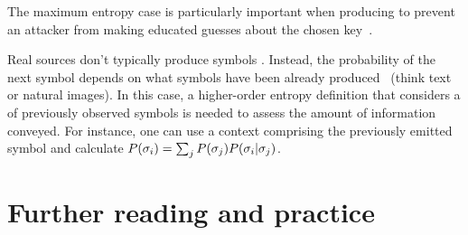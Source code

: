 %
The maximum entropy case is particularly important when producing 
to prevent an attacker from making educated guesses about the chosen key~\cite[Theorem 2.4]{stinson_crypto}.

Real sources don't typically produce symbols . Instead,
the probability of the next symbol depends on what symbols have been already
produced~\cite[\S 3]{shannon_communication} (think text or natural images). In this case,
a higher-order entropy definition that considers a  of previously observed symbols
is needed to assess the amount of information conveyed. For instance, one can use a context comprising
the previously emitted symbol and calculate $P(\sigma_i) = \sum_j P(\sigma_j) P(\sigma_i | \sigma_j)$.

\section*{Further reading and practice}
